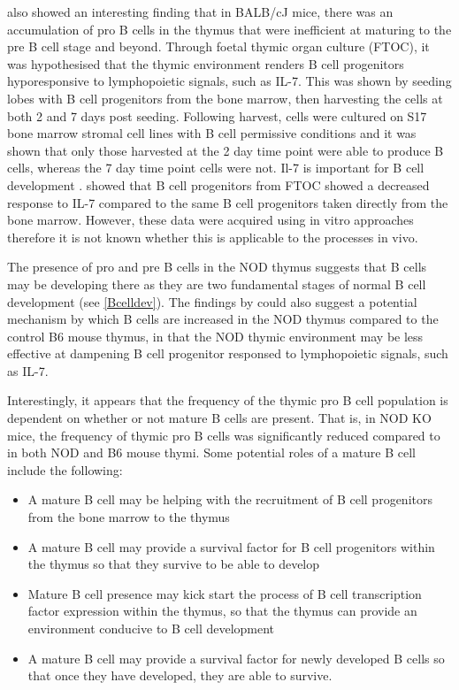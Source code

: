 \citet{Hashimoto2002} also showed an interesting finding that in BALB/cJ mice, there was an accumulation of pro B cells in the thymus that were inefficient at maturing to the pre B cell stage and beyond.
Through foetal thymic organ culture (FTOC), it was hypothesised that the thymic environment renders B cell progenitors hyporesponsive to lymphopoietic signals, such as IL-7.
This was shown by seeding lobes with B cell progenitors from the bone marrow, then harvesting the cells at both 2 and 7 days post seeding.
Following harvest, cells were cultured on S17 bone marrow stromal cell lines with B cell permissive conditions and it was shown that only those harvested at the 2 day time point were able to produce B cells, whereas the 7 day time point cells were not.
Il-7 is important for B cell development \citep{Corfe2012}. \citet{Hashimoto2002} showed that B cell progenitors from FTOC showed a decreased response to IL-7 compared to the same B cell progenitors taken directly from the bone marrow.
However, these data were acquired using in vitro approaches therefore it is not known whether this is applicable to the processes in vivo.

The presence of pro and pre B cells in the NOD thymus suggests that B cells may be developing there as they are two fundamental stages of normal B cell development (see \cref{Bcelldev}).
The findings by \citet{Hashimoto2002} could also suggest a potential mechanism by which B cells are increased in the NOD thymus compared to the control B6 mouse thymus, in that the NOD thymic environment may be less effective at dampening B cell progenitor responsed to lymphopoietic signals, such as IL-7.

Interestingly, it appears that the frequency of the thymic pro B cell population is dependent on whether or not mature B cells are present.
That is, in NOD KO mice, the frequency of thymic pro B cells was significantly reduced compared to in both NOD and B6 mouse thymi.
Some potential roles of a mature B cell include the following:
\begin{itemize}
\item A mature B cell may be helping with the recruitment of B cell progenitors from the bone marrow to the thymus
\item A mature B cell may provide a survival factor for B cell progenitors within the thymus so that they survive to be able to develop
\item Mature B cell presence may kick start the process of B cell transcription factor expression within the thymus, so that the thymus can provide an environment conducive to B cell development
\item A mature B cell may provide a survival factor for newly developed B cells so that once they have developed, they are able to survive.
\end{itemize}


